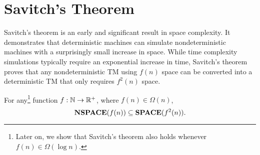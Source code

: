 \documentclass[11pt,twoside=off,numbers=noenddot]{scrbook}
\begin{document}
\section{Savitch's Theorem}
Savitch's theorem is an early and significant result in space complexity. It demonstrates that deterministic machines can simulate nondeterministic machines with a surprisingly small increase in space. While time complexity simulations typically require an exponential increase in time, Savitch's theorem proves that any nondeterministic TM using $f(n)$ space can be converted into a deterministic TM that only requires $f^{2}(n)$ space.
\begin{theorem}
    For any\footnote{Later on, we show that Savitch's theorem also holds whenever $f(n) \in \Omega(\log n)$.} function $f : \mathbb N \to \mathbb R^{+}$, where $f(n) \in \Omega(n)$,
    \[ \textbf{NSPACE}(f(n)) \subseteq \textbf{SPACE}(f^{2}(n)). \]
\end{theorem}
\end{document}
